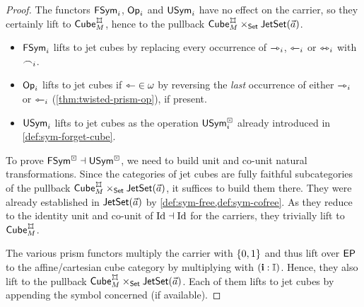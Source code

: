 \documentclass[a4paper]{memoir}
\begin{document}
\begin{proof}
	The functors $\mathsf{FSym}_i$, ${\mathsf{Op}}_i$ and $\mathsf{USym}_i$ have no effect on the carrier, so they certainly lift to $\cubecat_M^\mycubex$, hence to the pullback $\cubecat_M^\mycubex \times_\Set \jetset{\vec a}$.
	\begin{itemize}
		\item $\mathsf{FSym}_i$ lifts to jet cubes by replacing every occurrence of $\rightarrowtriangle_i$, $\leftarrowtriangle_i$ or $\leftrightarrowtriangle_i$ with $\frown_i$.
		\item ${\mathsf{Op}}_i$ lifts to jet cubes if ${\leftarrowtriangle} \in \omega$ by reversing the \emph{last} occurrence of either $\rightarrowtriangle_i$ or $\leftarrowtriangle_i$ (\cref{thm:twisted-prism-op}), if present.
		\item $\mathsf{USym}_i$ lifts to jet cubes as the operation $\mathsf{USym}^\boxdot_i$ already introduced in \cref{def:sym-forget-cube}.
	\end{itemize}
	To prove $\mathsf{FSym}^\boxdot \dashv \mathsf{USym}^\boxdot$, we need to build unit and co-unit natural transformations.
	Since the categories of jet cubes are fully faithful subcategories of the pullback $\cubecat_M^\mycubex \times_\Set \jetset{\vec a}$, it suffices to build them there.
	They were already established in $\mathsf{JetSet}(\vec a)$ by \cref{def:sym-free,def:sym-cofree}.
	As they reduce to the identity unit and co-unit of $\mathrm{Id} \dashv \mathrm{Id}$ for the carriers, they trivially lift to $\cubecat_M^\mycubex$.
	
	The various prism functors multiply the carrier with $\mathopen{}\left\{ 0, 1 \right\}\mathclose{}$ and thus lift over $\mathsf{EP}$ to the affine/cartesian cube category by multiplying with $(\mathbf{i} : {\mathbb I})$.
	Hence, they also lift to the pullback $\cubecat_M^\mycubex \times_\Set \jetset{\vec a}$.
	Each of them lifts to jet cubes by appending the symbol concerned (if available).
\end{proof}
\end{document}
